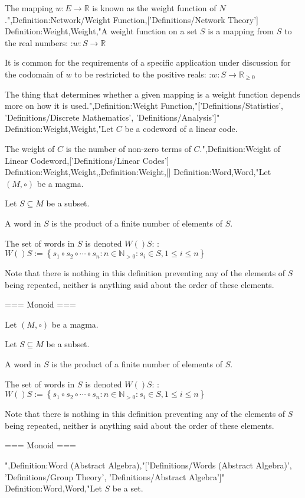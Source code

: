 The mapping $w: E \to \mathbb R$ is known as the weight function of $N$.",Definition:Network/Weight Function,['Definitions/Network Theory']
Definition:Weight,Weight,"A weight function on a set $S$ is a mapping from $S$ to the real numbers:
:$w: S \to \mathbb R$


It is common for the requirements of a specific application under discussion for the codomain of $w$ to be restricted to the positive reals:
:$w: S \to \mathbb R_{\ge 0}$


The thing that determines whether a given mapping is a weight function depends more on how it is used.",Definition:Weight Function,"['Definitions/Statistics', 'Definitions/Discrete Mathematics', 'Definitions/Analysis']"
Definition:Weight,Weight,"Let $C$ be a codeword of a linear code.

The weight of $C$ is the number of non-zero terms of $C$.",Definition:Weight of Linear Codeword,['Definitions/Linear Codes']
Definition:Weight,Weight,,Definition:Weight,[]
Definition:Word,Word,"Let $\left( M, \circ \right)$ be a magma.

Let $S \subseteq M$ be a subset.

A word in $S$ is the product of a finite number of elements of $S$.


The set of words in $S$ is denoted $W \left(   \right)S$:
:$W \left(   \right)S := \left\lbrace s_1 \circ s_2 \circ \cdots \circ s_n: n \in \mathbb N_{>0}: s_i \in S, 1 \le i \le n \right\rbrace$


Note that there is nothing in this definition preventing any of the elements of $S$ being repeated, neither is anything said about the order of these elements.


=== Monoid ===

Let $\left( M, \circ \right)$ be a magma.

Let $S \subseteq M$ be a subset.

A word in $S$ is the product of a finite number of elements of $S$.


The set of words in $S$ is denoted $W \left(   \right)S$:
:$W \left(   \right)S := \left\lbrace s_1 \circ s_2 \circ \cdots \circ s_n: n \in \mathbb N_{>0}: s_i \in S, 1 \le i \le n \right\rbrace$


Note that there is nothing in this definition preventing any of the elements of $S$ being repeated, neither is anything said about the order of these elements.


=== Monoid ===

",Definition:Word (Abstract Algebra),"['Definitions/Words (Abstract Algebra)', 'Definitions/Group Theory', 'Definitions/Abstract Algebra']"
Definition:Word,Word,"Let $S$ be a set.



